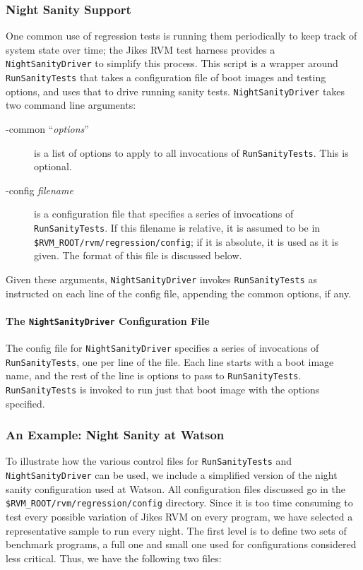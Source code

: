 \subsubsection{Night Sanity Support}
 
One common use of regression tests is running them periodically to
keep track of system state over time; the Jikes RVM test harness
provides a {\tt{NightSanityDriver}} to simplify this process.  This
script is a wrapper around {\tt{RunSanityTests}} that takes a
configuration file of boot images and testing options, and uses that
to drive running sanity tests.  {\tt{NightSanityDriver}} takes two
command line arguments:
\begin{description}
\item[-common ``{\em{options}}''] is a list of options to apply to all
invocations of {\tt{RunSanityTests}}.  This is optional.
\item[-config {\em filename}] is a configuration file that specifies a
series of invocations of {\tt{RunSanityTests}}.  If this filename is
relative, it is assumed to be in {\tt \$RVM\_\-ROOT/rvm/regression/config}; if
it is absolute, it is used as it is given.  The format of this file is
discussed below.
\end{description}

 Given these arguments, {\tt{NightSanityDriver}} invokes
{\tt{RunSanityTests}} as instructed on each line of the config file,
appending the common options, if any.

\paragraph{The \texttt{\textbf{NightSanityDriver}} Configuration File}

 The config file for {\tt{NightSanityDriver}} specifies a series of
invocations of {\tt{RunSanityTests}}, one per line of the file.  Each
line starts with a boot image name, and the rest of the line is
options to pass to {\tt{RunSanityTests}}.  {\tt{RunSanityTests}} is
invoked to run just that boot image with the options specified.

\subsubsection{An Example: Night Sanity at Watson}

 To illustrate how the various control files for {\tt{RunSanityTests}}
and {\tt{NightSanityDriver}} can be used, we include a simplified
version of the night sanity configuration used at Watson.  All
configuration files discussed go in the
{\tt \$RVM\_\-ROOT/rvm/regression/config} directory. Since it is
too time consuming to test every possible variation of Jikes RVM on
every program, we have selected a representative sample to run every
night.  The first level is to define two sets of benchmark programs, a
full one and small one used for configurations considered less
critical.  Thus, we have the following two files:

